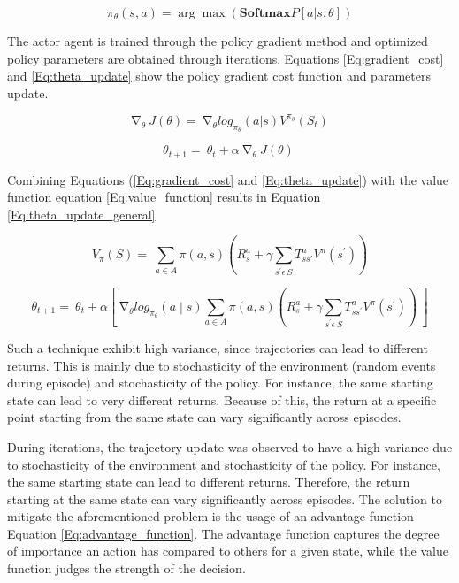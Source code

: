 \begin{equation}\label{Eq:optimum_policy}
    \pi_{\theta}\left(s,a\right) = \arg \max ⁡(\textbf{Softmax} P[ a|s,\theta])
\end{equation}

The actor agent is trained through the policy gradient method and optimized policy parameters are obtained through iterations. Equations \ref{Eq:gradient_cost} and \ref{Eq:theta_update} show the policy gradient cost function and parameters update.

\begin{equation}\label{Eq:gradient_cost}
    \mathrm{\nabla}_\theta\ J\left(\theta\right)=\ \mathrm{\nabla}_\theta{log}_{\pi_\theta}(a|s)V^{\pi_\theta}(S_t)	
\end{equation}
			
\begin{equation}\label{Eq:theta_update}
    \theta_{t+1}=\ \theta_t+\alpha\ \mathrm{\nabla}_\theta\ J\left(\theta\right)\ 
\end{equation}

Combining Equations (\ref{Eq:gradient_cost} and \ref{Eq:theta_update}) with the value function equation \ref{Eq:value_function} results in Equation \ref{Eq:theta_update_general}

\begin{equation}\label{Eq:value_function}
V_\pi(S)=\ \sum_{a\in A}{\pi\left(a,s\right)(R_s^a+\gamma\sum_{s^\prime\epsilon\ S} T_{ss\prime}^aV^\pi(s^\prime))}	    
\end{equation}

\begin{equation}\label{Eq:theta_update_general}
    \theta_{t+1}=\ \theta_t+\alpha\left[\ \mathrm{\nabla}_\theta{log}_{\pi_\theta}\left(a\middle| s\right)\sum_{a\in A}\pi\left(a,s\right)\left(R_s^a+\gamma\sum_{s^\prime\epsilon\ S} T_{ss^\prime}^aV^\pi\left(s^\prime\right)\right)\ \right]
\end{equation}

Such a technique exhibit high variance, since trajectories can lead to different returns. This is mainly due to stochasticity of the environment (random events during episode) and stochasticity of the policy. For instance, the same starting state can lead to very different returns. Because of this, the return at a specific point starting from the same state can vary significantly across episodes.

During iterations, the trajectory update was observed to have a high variance due to stochasticity of the environment and stochasticity of the policy. For instance, the same starting state can lead to different returns. Therefore, the return starting at the same state can vary significantly across episodes. The solution to mitigate the aforementioned problem is the usage of an advantage function Equation \ref{Eq:advantage_function}. The advantage function captures the degree of importance an action has compared to others for a given state, while the value function judges the strength of the decision.

